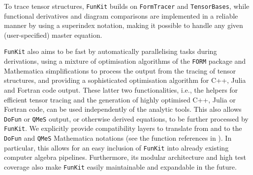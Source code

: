 \documentclass[preprint,10pt,sort&compress]{elsarticle}
\newcommand{\FunKit}{\texttt{FunKit}\xspace}
\newcommand{\QMeS}{\texttt{QMeS}\xspace}
\newcommand{\DoFun}{\texttt{DoFun}\xspace}
\newcommand{\FORM}{\texttt{FORM}\xspace}
\begin{document}
To trace tensor structures, \FunKit builds on \texttt{FormTracer} and \texttt{TensorBases}, while functional derivatives and diagram comparisons are implemented in a reliable manner by using a superindex notation, making it possible to handle any given (user-specified) master equation.

\FunKit also aims to be fast by automatically parallelising tasks during derivations, using a mixture of optimisation algorithms of the \FORM package and Mathematica simplifications to process the output from the tracing of tensor structures, and providing a sophisticated optimisation algorithm for C++, Julia and Fortran code output.
These latter two functionalities, i.e., the helpers for efficient tensor tracing and the generation of highly optimised C++, Julia or Fortran code, can be used independently of the analytic tools. 
This also allows \DoFun or \QMeS output, or otherwise derived equations, to be further processed by \FunKit. We explicitly provide compatibility layers to translate from and to the \DoFun and \QMeS Mathematica notations (see the function references in ). In particular, this allows for an easy inclusion of \FunKit into already existing computer algebra pipelines.
Furthermore, its modular architecture and high test coverage also make \FunKit  easily maintainable and expandable in the future.
\end{document}
